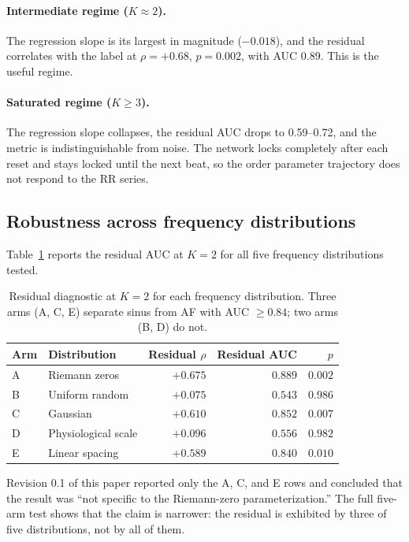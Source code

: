 \documentclass[11pt]{article}
\begin{document}
\paragraph{Intermediate regime ($K \approx 2$).} The regression slope is
its largest in magnitude ($-0.018$), and the residual correlates with
the label at $\rho = +0.68$, $p = 0.002$, with AUC 0.89. This is the
useful regime.

\paragraph{Saturated regime ($K \geq 3$).} The regression slope
collapses, the residual AUC drops to 0.59--0.72, and the metric is
indistinguishable from noise. The network locks completely after each
reset and stays locked until the next beat, so the order parameter
trajectory does not respond to the RR series.

\subsection{Robustness across frequency distributions}

Table~\ref{tab:arms} reports the residual AUC at $K = 2$ for all five
frequency distributions tested.

\begin{table}[h]
\centering
\begin{tabular}{llrrr}
\toprule
Arm & Distribution & Residual $\rho$ & Residual AUC & $p$ \\
\midrule
A & Riemann zeros & $+0.675$ & $0.889$ & $0.002$ \\
B & Uniform random & $+0.075$ & $0.543$ & $0.986$ \\
C & Gaussian & $+0.610$ & $0.852$ & $0.007$ \\
D & Physiological scale & $+0.096$ & $0.556$ & $0.982$ \\
E & Linear spacing & $+0.589$ & $0.840$ & $0.010$ \\
\bottomrule
\end{tabular}
\caption{Residual diagnostic at $K = 2$ for each frequency
distribution. Three arms (A, C, E) separate sinus from AF with
AUC $\geq 0.84$; two arms (B, D) do not.}
\label{tab:arms}
\end{table}

Revision 0.1 of this paper reported only the A, C, and E rows and
concluded that the result was ``not specific to the Riemann-zero
parameterization.'' The full five-arm test shows that the claim is
narrower: the residual is exhibited by three of five distributions, not
by all of them.
\end{document}

